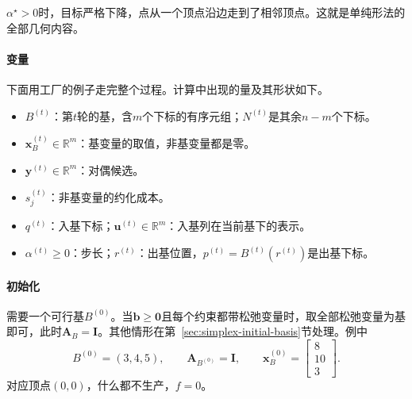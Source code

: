 $\alpha^\star>0$时，目标严格下降，点从一个顶点沿边走到了相邻顶点。这就是单纯形法的全部几何内容。

\paragraph{变量}
下面用工厂的例子走完整个过程。计算中出现的量及其形状如下。
\begin{itemize}
 \item $B^{(t)}$：第$t$轮的基，含$m$个下标的有序元组；$N^{(t)}$是其余$n-m$个下标。
 \item $\bm{x}_B^{(t)}\in\mathbb{R}^m$：基变量的取值，非基变量都是零。
 \item $\bm{y}^{(t)}\in\mathbb{R}^m$：对偶候选。
 \item $s_j^{(t)}$：非基变量的约化成本。
 \item $q^{(t)}$：入基下标；$\bm{u}^{(t)}\in\mathbb{R}^m$：入基列在当前基下的表示。
 \item $\alpha^{(t)}\geq0$：步长；$r^{(t)}$：出基位置，$p^{(t)}=B^{(t)}(r^{(t)})$是出基下标。
\end{itemize}

\paragraph{初始化}
需要一个可行基$B^{(0)}$。当$\bm{b}\geq\bm{0}$且每个约束都带松弛变量时，取全部松弛变量为基即可，此时$\bm{A}_B=\bm{I}$。其他情形在第~\ref{sec:simplex-initial-basis}节处理。例中
\[
 B^{(0)}=(3,4,5),\qquad \bm{A}_{B^{(0)}}=\bm{I},\qquad \bm{x}_B^{(0)}=\begin{bmatrix}8\\10\\3\end{bmatrix}.
\]
对应顶点$(0,0)$，什么都不生产，$f=0$。

